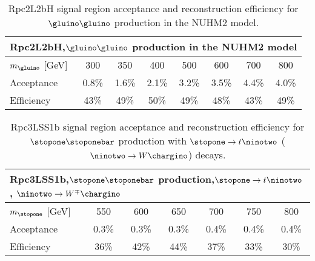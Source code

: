 \begin{table}[ht]\centering\begin{tabular}{|l|c|c|c|c|c|c|c|}\hline
\multicolumn{8}{|l|}{Rpc2L2bH,\quad $\gluino\gluino$ production in the NUHM2 model}\\\hline
$m_{\gluino}$ [GeV] & 300 & 350 & 400 & 500 & 600 & 700 & 800 \\\hline
Acceptance & 0.8\% & 1.6\% & 2.1\% & 3.2\% & 3.5\% & 4.4\% & 4.0\% \\
Efficiency & 43\% & 49\% & 50\% & 49\% & 48\% & 43\% & 49\%\\\hline
\end{tabular}
\caption{Rpc2L2bH signal region acceptance and reconstruction efficiency for $\gluino\gluino$ production in the NUHM2 model.}
\end{table}

\begin{table}[ht]\centering\begin{tabular}{|l|c|c|c|c|c|c|}\hline
\multicolumn{7}{|l|}{Rpc3LSS1b,\quad $\stopone\stoponebar$ production,\quad $\stopone\to t\ninotwo$, $\ninotwo\to W^\mp\chargino$}\\\hline
$m_{\stopone}$ [GeV] & 550 & 600 & 650 & 700 & 750 & 800 \\\hline
Acceptance & 0.3\% & 0.3\% & 0.3\% & 0.4\% & 0.4\% & 0.4\%\\
Efficiency & 36\% & 42\% & 44\% & 37\% & 33\% & 30\%\\\hline
\end{tabular}
\caption{Rpc3LSS1b signal region acceptance and reconstruction efficiency for $\stopone\stoponebar$ production with $\stopone\to t\ninotwo$ ($\ninotwo\to W\chargino$) decays.}
\end{table}
